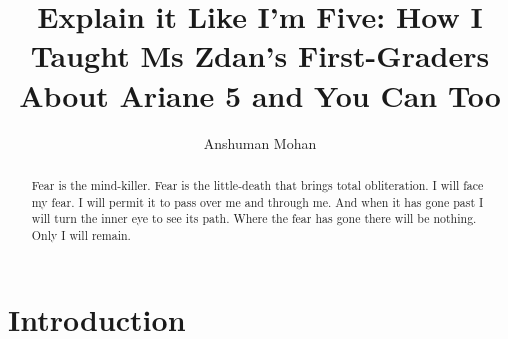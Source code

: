 \documentclass[sigplan,review]{acmart}
\begin{document}
\title[Explain it Like I'm Five]{Explain it Like I'm Five: How I Taught Ms Zdan's First-Graders About Ariane 5 and You Can Too}

\author{Anshuman Mohan}

\begin{abstract}

Fear is the mind-killer.
Fear is the little-death that brings total obliteration.
I will face my fear.
I will permit it to pass over me and through me.
And when it has gone past I will turn the inner eye to see its path.
Where the fear has gone there will be nothing.
Only I will remain.

\end{abstract}

\maketitle

\section{Introduction}


\end{document}
